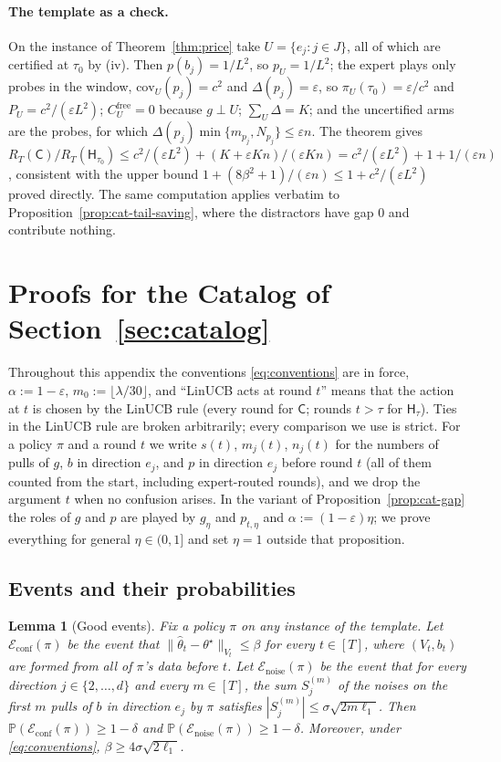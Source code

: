 \documentclass{article}
\newtheorem{lemma}{Lemma}
\theoremstyle{definition}
\theoremstyle{remark}
\newcommand{\Prb}{\mathbb{P}}
\newcommand{\eps}{\varepsilon}
\theoremstyle{remark}
\newcommand{\Cold}{\mathsf{C}}
\newcommand{\Hyb}{\mathsf{H}}
\begin{document}
\paragraph{The template as a check.}
On the instance of Theorem~\ref{thm:price} take $U=\{e_j:j\in J\}$, all of
which are certified at $\tau_0$ by (iv). Then $p(b_j)=1/L^2$, so $p_U=1/L^2$;
the expert plays only probes in the window, $\mathrm{cov}_U(p_j)=c^2$ and
$\Delta(p_j)=\eps$, so $\pi_U(\tau_0)=\eps/c^2$ and $P_U=c^2/(\eps L^2)$;
$C^{\mathrm{free}}_U=0$ because $g\perp U$; $\sum_U\Delta=K$; and the
uncertified arms are the probes, for which
$\Delta(p_j)\min\{m_{p_j},N_{p_j}\}\le\eps n$. The theorem gives
$R_T(\Cold)/R_T(\Hyb_{\tau_0})\le c^2/(\eps L^2)+(K+\eps Kn)/(\eps Kn)=c^2/(\eps L^2)+1+1/(\eps n)$,
consistent with the upper bound $1+(8\beta^2+1)/(\eps n)\le1+c^2/(\eps L^2)$
proved directly. The same computation applies verbatim to
Proposition~\ref{prop:cat-tail-saving}, where the distractors have gap $0$
and contribute nothing.

\section{Proofs for the Catalog of Section~\ref{sec:catalog}}
\label{app:catalog}

Throughout this appendix the conventions \eqref{eq:conventions} are in force,
$\alpha:=1-\eps$, $m_0:=\lfloor\lambda/30\rfloor$, and ``LinUCB acts at round
$t$'' means that the action at $t$ is chosen by the LinUCB rule (every round
for $\Cold$; rounds $t>\tau$ for $\Hyb_\tau$). Ties in the LinUCB rule are
broken arbitrarily; every comparison we use is strict. For a policy $\pi$ and
a round $t$ we write $s(t)$, $m_j(t)$, $n_j(t)$ for the numbers of pulls of
$g$, $b$ in direction $e_j$, and $p$ in direction $e_j$ before round $t$
(all of them counted from the start, including expert-routed rounds), and we
drop the argument $t$ when no confusion arises. In the variant of
Proposition~\ref{prop:cat-gap} the roles of $g$ and $p$ are played by
$g_\eta$ and $p_{t,\eta}$ and $\alpha:=(1-\eps)\eta$; we prove everything for
general $\eta\in(0,1]$ and set $\eta=1$ outside that proposition.

\subsection{Events and their probabilities}

\begin{lemma}[Good events]
\label{lem:cat-events}
Fix a policy $\pi$ on any instance of the template. Let
$\mathcal E_{\mathrm{conf}}(\pi)$ be the event that
$\|\widehat\theta_t-\theta^\star\|_{V_t}\le\beta$ for every $t\in[T]$, where
$(V_t,b_t)$ are formed from all of $\pi$'s data before $t$. Let
$\mathcal E_{\mathrm{noise}}(\pi)$ be the event that for every direction
$j\in\{2,\dots,d\}$ and every $m\in[T]$, the sum $S_j^{(m)}$ of the noises on
the first $m$ pulls of $b$ in direction $e_j$ by $\pi$ satisfies
$|S_j^{(m)}|\le\sigma\sqrt{2m\ell_1}$. Then
$\Prb(\mathcal E_{\mathrm{conf}}(\pi))\ge1-\delta$ and
$\Prb(\mathcal E_{\mathrm{noise}}(\pi))\ge1-\delta$. Moreover, under
\eqref{eq:conventions}, $\beta\ge4\sigma\sqrt{2\ell_1}$.
\end{lemma}
\end{document}
